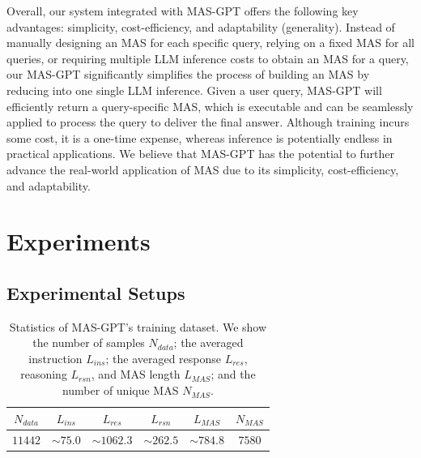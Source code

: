 \documentclass{article}
\theoremstyle{plain}
\theoremstyle{definition}
\theoremstyle{remark}
\begin{document}
Overall, our system integrated with MAS-GPT offers the following key advantages: simplicity, cost-efficiency, and adaptability (generality).
Instead of manually designing an MAS for each specific query, relying on a fixed MAS for all queries, or requiring multiple LLM inference costs to obtain an MAS for a query, our MAS-GPT significantly simplifies the process of building an MAS by reducing into one single LLM inference.
Given a user query, MAS-GPT will efficiently return a query-specific MAS, which is executable and can be seamlessly applied to process the query to deliver the final answer.
Although training incurs some cost, it is a one-time expense, whereas inference is potentially endless in practical applications.
We believe that MAS-GPT has the potential to further advance the real-world application of MAS due to its simplicity, cost-efficiency, and adaptability.

\section{Experiments}

\subsection{Experimental Setups}

\begin{table}[t]
\caption{Statistics of MAS-GPT's training dataset. We show the number of samples $N_{data}$; the averaged instruction $L_{ins}$; the averaged response $L_{res}$, reasoning $L_{rsn}$, and MAS length $L_{MAS}$; and the number of unique MAS $N_{MAS}$.}
\setlength\tabcolsep{5pt}
\label{tab:data_stats}
\vspace{-4mm}
\begin{center}
\begin{small}
\begin{sc}
\begin{tabular}{c|c|ccc|c}
\toprule
$N_{data}$ & $L_{ins}$ & $L_{res}$ & $L_{rsn}$ & $L_{MAS}$ & $N_{MAS}$\\
\midrule
$11442$ & $\sim 75.0$ & $\sim 1062.3$ & $\sim 262.5$ & $\sim 784.8$ & $7580$\\
\bottomrule
\end{tabular}
\end{sc}
\end{small}
\end{center}
\vspace{-4mm}
\end{table}
\end{document}
